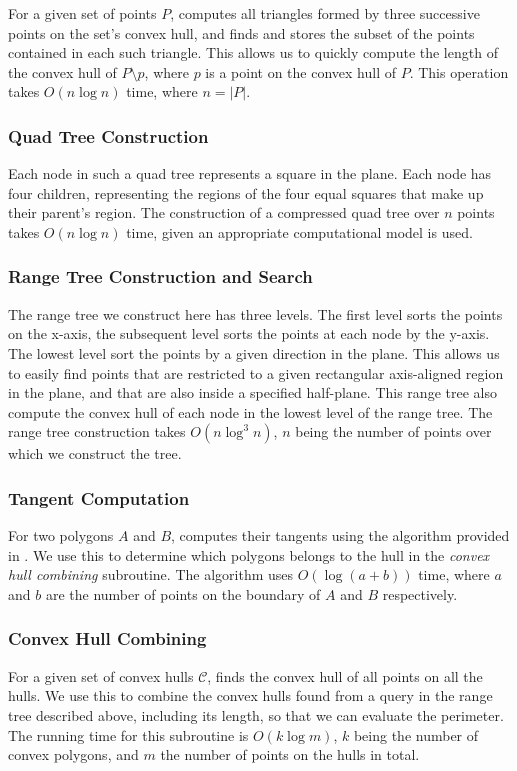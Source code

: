 \documentclass{article}
\begin{document}
For a given set of points $P$, computes all triangles formed by three successive points on the set's convex hull, and finds and stores the subset of the points contained in each such triangle. This allows us to quickly compute the length of the convex hull of $P \setminus {p}$, where $p$ is a point on the convex hull of $P$. This operation takes $O(n \log n)$ time, where $n = |P|$.
    
\subsubsection{Quad Tree Construction} 

Each node in such a quad tree represents a square in the plane. Each node has four children, representing the regions of the four equal squares that make up their parent's region. The construction of a compressed quad tree over $n$ points takes $O(n \log n)$ time, given an appropriate computational model is used.

\subsubsection{Range Tree Construction and Search}

The range tree we construct here has three levels. The first level sorts the points on the x-axis, the subsequent level sorts the points at each node by the y-axis. The lowest level sort the points by a given direction in the plane. This allows us to easily find points that are restricted to a given rectangular axis-aligned region in the plane, and that are also inside a specified half-plane. This range tree also compute the convex hull of each node in the lowest level of the range tree. The range tree construction takes $O(n\log^3n)$, $n$ being the number of points over which we construct the tree.

\subsubsection{Tangent Computation} \label{subsub:tangent_computation}

For two polygons $A$ and $B$, computes their tangents using the algorithm provided in \cite{ks95}. We use this to determine which polygons belongs to the hull in the \textit{convex hull combining} subroutine. The algorithm uses $O(\log(a + b))$ time, where $a$ and $b$ are the number of points on the boundary of $A$ and $B$ respectively.

\subsubsection{Convex Hull Combining}
For a given set of convex hulls $\mathcal{C}$, finds the convex hull of all points on all the hulls. We use this to combine the convex hulls found from a query in the range tree described above, including its length, so that we can evaluate the perimeter. The running time for this subroutine is $O(k \log m)$, $k$ being the number of convex polygons, and $m$ the number of points on the hulls in total.
\end{document}
